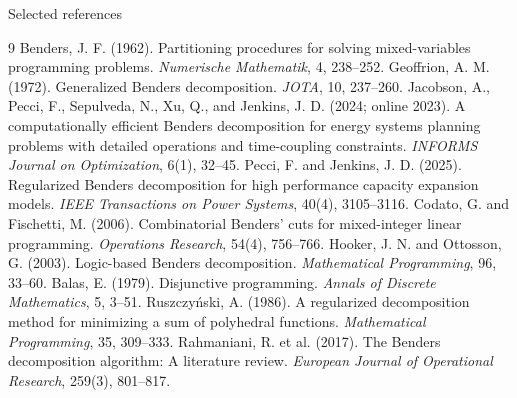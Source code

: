 \documentclass[aspectratio=169,10pt]{beamer}
\begin{document}
\begin{frame}{Selected references}
\footnotesize
\begin{thebibliography}{9}
 Benders, J. F. (1962). Partitioning procedures for solving mixed-variables programming problems. \emph{Numerische Mathematik}, 4, 238--252.
 Geoffrion, A. M. (1972). Generalized Benders decomposition. \emph{JOTA}, 10, 237--260.
 Jacobson, A., Pecci, F., Sepulveda, N., Xu, Q., and Jenkins, J. D. (2024; online 2023). A computationally efficient Benders decomposition for energy systems planning problems with detailed operations and time-coupling constraints. \emph{INFORMS Journal on Optimization}, 6(1), 32--45.
 Pecci, F. and Jenkins, J. D. (2025). Regularized Benders decomposition for high performance capacity expansion models. \emph{IEEE Transactions on Power Systems}, 40(4), 3105--3116.
 Codato, G. and Fischetti, M. (2006). Combinatorial Benders' cuts for mixed-integer linear programming. \emph{Operations Research}, 54(4), 756--766.
 Hooker, J. N. and Ottosson, G. (2003). Logic-based Benders decomposition. \emph{Mathematical Programming}, 96, 33--60.
 Balas, E. (1979). Disjunctive programming. \emph{Annals of Discrete Mathematics}, 5, 3--51.
 Ruszczyński, A. (1986). A regularized decomposition method for minimizing a sum of polyhedral functions. \emph{Mathematical Programming}, 35, 309--333.
 Rahmaniani, R. et al. (2017). The Benders decomposition algorithm: A literature review. \emph{European Journal of Operational Research}, 259(3), 801--817.
\end{thebibliography}
\end{frame}
\end{document}
